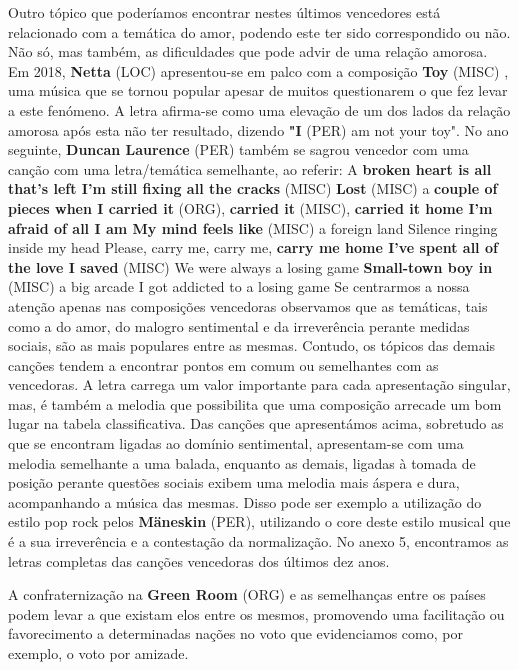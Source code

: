 \documentclass[12pt,a4paper]{article}
\begin{document}
Outro  tópico  que  poderíamos  encontrar  nestes  últimos  vencedores  está relacionado com a temática do amor, podendo este ter sido correspondido ou não. Não só, mas também, as dificuldades que pode advir de uma relação amorosa. Em 2018, \textbf{Netta} (LOC) apresentou-se em palco com a composição \textbf{Toy} (MISC) , uma música que se tornou popular apesar de muitos  questionarem  o que fez  levar  a este fenómeno. A letra afirma-se como  uma elevação de um dos lados da relação amorosa após esta não ter resultado, dizendo \textbf{"I} (PER) am not your toy". No ano seguinte, \textbf{Duncan Laurence} (PER) também se sagrou vencedor com uma canção com uma letra/temática semelhante, ao referir: A \textbf{broken heart is all that's left I'm still fixing all the cracks} (MISC) \textbf{Lost} (MISC) a \textbf{couple of pieces when I carried it} (ORG), \textbf{carried it} (MISC), \textbf{carried it home I'm afraid of all I am My mind feels like} (MISC) a foreign land Silence ringing inside my head Please, carry me, carry me, \textbf{carry me home I've spent all of the love I saved} (MISC) We were always a losing game \textbf{Small-town boy in} (MISC) a big arcade I got addicted to a losing game Se centrarmos a nossa atenção apenas nas composições vencedoras observamos que as temáticas, tais como a do amor, do malogro sentimental e da irreverência perante medidas sociais, são as mais populares entre as mesmas. Contudo, os tópicos das demais canções  tendem  a  encontrar  pontos  em  comum  ou  semelhantes  com  as  vencedoras.  A letra  carrega  um  valor  importante  para  cada  apresentação  singular,  mas,  é  também  a melodia  que  possibilita  que  uma  composição  arrecade  um  bom  lugar  na  tabela classificativa.  Das  canções  que  apresentámos  acima,  sobretudo  as  que  se  encontram ligadas  ao  domínio  sentimental,  apresentam-se  com  uma  melodia  semelhante  a  uma balada, enquanto as demais, ligadas à tomada de posição perante questões sociais exibem uma melodia mais áspera e dura, acompanhando a música das mesmas. Disso pode ser exemplo  a utilização do  estilo  pop rock pelos  \textbf{Mäneskin} (PER),  utilizando o core deste estilo musical  que  é  a  sua  irreverência  e  a  contestação  da  normalização.  No  anexo  5, encontramos as letras completas das canções vencedoras dos últimos dez anos.

A confraternização na \textbf{Green Room} (ORG) e as semelhanças entre os países podem levar a  que  existam  elos  entre  os  mesmos,  promovendo  uma  facilitação  ou  favorecimento  a determinadas nações no voto que evidenciamos como, por exemplo, o voto por amizade.
\end{document}
